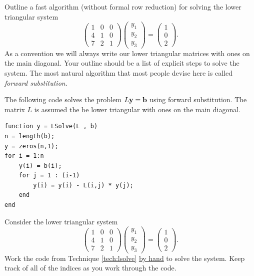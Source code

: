 \begin{problem}
    Outline a fast algorithm (without formal row reduction) for solving the lower triangular system
    \[ \begin{pmatrix} 1 & 0 & 0 \\ 4 & 1 & 0 \\ 7 & 2 & 1 \end{pmatrix} \begin{pmatrix}
        y_1 \\ y_2 \\ y_3 \end{pmatrix} = \begin{pmatrix} 1 \\ 0 \\ 2\end{pmatrix}. \]
    As a convention we will always write our lower triangular matrices with ones on the
    main diagonal.  Your outline should be a list of explicit steps to solve the system.
    The most natural algorithm that most people devise here is called {\it forward
    substitution}.
\end{problem}


\begin{technique}\label{tech:lsolve}
    The following code solves the problem $L {\bf y} = {\bf b}$ using forward
    substitution.  The matrix $L$ is assumed the be lower triangular with ones on the main
    diagonal.
\begin{lstlisting}
function y = LSolve(L , b)
n = length(b);
y = zeros(n,1);
for i = 1:n
    y(i) = b(i);
    for j = 1 : (i-1)
        y(i) = y(i) - L(i,j) * y(j);
    end
end
\end{lstlisting}
\end{technique}

\begin{problem}
    Consider the lower triangular system 
    \[ \begin{pmatrix} 1 & 0 & 0 \\ 4 & 1 & 0 \\ 7 & 2 & 1 \end{pmatrix} \begin{pmatrix}
        y_1 \\ y_2 \\ y_3 \end{pmatrix} = \begin{pmatrix} 1 \\ 0 \\ 2\end{pmatrix}. \]
    Work the code from Technique \ref{tech:lsolve} \underline{by hand} to solve the
    system.  Keep track of all of the indices as you work through the code.
\end{problem}

